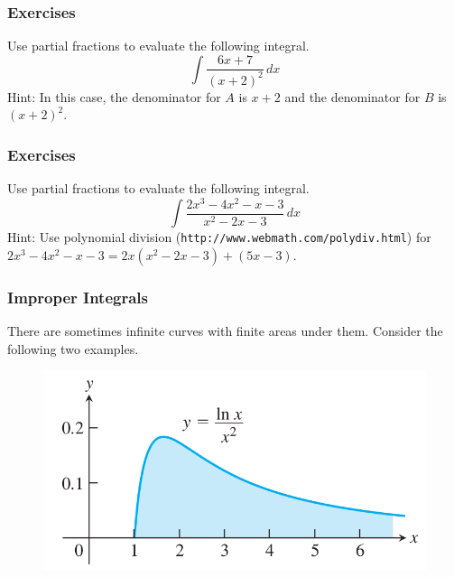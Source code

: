 \documentclass[xcolor=dvipsnames]{beamer}
\begin{document}
\begin{frame}
  \frametitle{Exercises}
  {\ubung} Use partial fractions to evaluate the following integral.
  \begin{equation}
    \label{eq:ietahpha}
    \int\frac{6x+7}{\left(x+2\right)^{2}}\,dx
  \end{equation}
  Hint: In this case, the denominator for $A$ is $x+2$ and the
  denominator for $B$ is $\left(x+2\right)^{2}$.
\end{frame}

\begin{frame}
  \frametitle{Exercises}
  {\ubung} Use partial fractions to evaluate the following integral.
  \begin{equation}
    \label{eq:saeheing}
    \int\frac{2x^{3}-4x^{2}-x-3}{x^{2}-2x-3}\,dx
  \end{equation}
  Hint: Use polynomial division (\texttt{http://www.webmath.com/polydiv.html}) for
  $2x^{3}-4x^{2}-x-3=2x(x^{2}-2x-3)+(5x-3)$.
\end{frame}

\begin{frame}
  \frametitle{Improper Integrals}
  There are sometimes infinite curves with finite areas under them.
  Consider the following two examples. 
  \begin{figure}[h]
    \includegraphics[scale=0.4]{./diagrams/improper1.png}
  \end{figure}
\end{frame}
\end{document}
